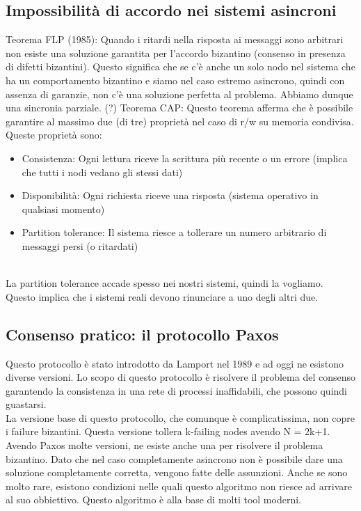 \newpage
\subsection{Impossibilità di accordo nei sistemi asincroni}
 
Teorema FLP (1985): Quando i ritardi nella risposta ai messaggi sono arbitrari non esiste una soluzione garantita per l'accordo bizantino (consenso in presenza di difetti bizantini). Questo significa che se c'è anche un solo nodo nel sistema che ha un comportamento bizantino e siamo nel caso estremo asincrono, quindi con assenza di garanzie, non c'è una soluzione perfetta al problema. Abbiamo dunque una sincronia parziale. (?)
\newline
\newline
Teorema CAP: Questo teorema afferma che è possibile garantire al massimo due (di tre) proprietà nel caso di r/w su memoria condivisa. Queste proprietà sono:
\begin{itemize}
    \item Consistenza: Ogni lettura riceve la scrittura più recente o un errore (implica che tutti i nodi vedano gli stessi dati)
    \item Disponibilità: Ogni richiesta riceve una risposta (sistema operativo in qualsiasi momento)
    \item Partition tolerance: Il sistema riesce a tollerare un numero arbitrario di messaggi persi (o ritardati)
\end{itemize}
\phantom \\

La partition tolerance accade spesso nei nostri sistemi, quindi la vogliamo. Questo implica che i sistemi reali devono rinunciare a uno degli altri due.

\subsection{Consenso pratico: il protocollo Paxos}
Questo protocollo è stato introdotto da Lamport nel 1989 e ad oggi ne esistono diverse versioni. Lo scopo di questo protocollo è risolvere il problema del consenso garantendo la consistenza in una rete di processi inaffidabili, che possono quindi guastarsi. \\
La versione base di questo protocollo, che comunque è complicatissima, non copre i failure bizantini. Questa versione tollera k-failing nodes avendo N = 2k+1.\\
Avendo Paxos molte versioni, ne esiste anche una per risolvere il problema bizantino. Dato che nel caso completamente asincrono non è possibile dare una soluzione completamente corretta, vengono fatte delle assunzioni. Anche se sono molto rare, esistono condizioni nelle quali questo algoritmo non riesce ad arrivare al suo obbiettivo. Questo algoritmo è alla base di molti tool moderni.

